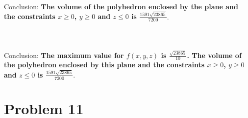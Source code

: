 \documentclass[12pt]{report}
\begin{document}
\vspace{\baselineskip}
\vspace{\baselineskip}
\noindent
Conclusion: \textbf{The volume of the polyhedron enclosed by the plane and the constraints $x \ge 0$, $y \ge 0$ and $z \le 0$ is $\frac{1591\sqrt{23865}}{7200}$}.
\\\\
\\\\
\noindent
Conclusion: \textbf{The maximum value for $f(x,y,z)$ is $\frac{\sqrt{23865}}{10}$. The volume of the polyhedron enclosed by this plane and the constraints $x \ge 0$, $y \ge 0$ and $z \le 0$ is $\frac{1591\sqrt{23865}}{7200}$}.



\chapter*{Problem 11}
\end{document}
